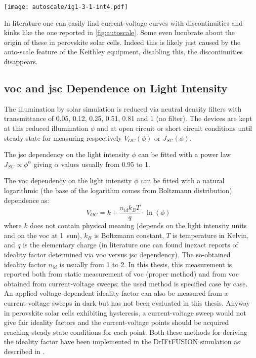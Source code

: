 		\label{autoscale}

			\begin{SCfigure}%
				\centering
				\texttt{[image: autoscale/ig1-3-1-int4.pdf]}
				\label{fig:autoscale}
			\end{SCfigure}

			In literature one can easily find current-voltage curves with discontinuities and kinks\cite{Li2016,Snaith2014,Zhang2015} like the one reported in \cref{fig:autoscale}. Some even lucubrate about the origin of these in perovskite solar cells. Indeed this is likely just caused by the auto-scale feature of the Keithley equipment, disabling this, the discontinuities disappears.

	\subsection{\Gls{voc} and \gls{jsc} Dependence on Light Intensity}
		The illumination by solar simulation is reduced via neutral density filters with transmittance of 0.05, 0.12, 0.25, 0.51, 0.81 and 1 (no filter). The devices are kept at this reduced illumination $\phi$ and at open circuit or short circuit conditions until steady state for measuring respectively $V_{OC}(\phi)$ or $J_{SC}(\phi)$.
		
		\label{methods_jsc_intensity} The \gls{jsc} dependency on the light intensity $\phi$ can be fitted with a power law $J_{SC} \propto \phi^\alpha$ giving $\alpha$ values usually from 0.95 to 1.
		
		\label{methods_voc_intensity} The \gls{voc} dependency on the light intensity $\phi$ can be fitted with a natural logarithmic (the base of the logarithm comes from Boltzmann distribution) dependence as:
		$$V_{OC} = k + \frac{n_{id} k_B T}{q}\cdot\ln(\phi)$$
		where $k$ does not contain physical meaning (depends on the light intensity units and on the \gls{voc} at 1~sun), $k_B$ is Boltzmann constant, $T$ is temperature in Kelvin, and $q$ is the elementary charge\cite{Calado2018b} (in literature one can found inexact reports of ideality factor determined via \gls{voc} versus \gls{jsc} dependency). The so-obtained ideality factor $n_{id}$ is usually from 1 to 2. In this thesis, this measurement is reported both from static measurement of \gls{voc} (proper method) and from \gls{voc} obtained from current-voltage sweeps; the used method is specified case by case.	An applied voltage dependent ideality factor can also be measured from a current-voltage sweeps in dark but has not been evaluated in this thesis. Anyway in perovskite solar cells exhibiting hysteresis, a current-voltage sweep would not give fair ideality factors and the current-voltage points should be acquired reaching steady state conditions for each point. Both these methods for deriving the ideality factor have been implemented in the DrIFtFUSION simulation as described in .
		
